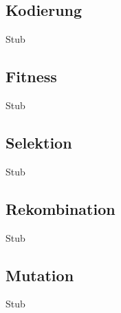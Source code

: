 \subsection{Kodierung}
Stub

\subsection{Fitness}
Stub

\subsection{Selektion}
Stub

\subsection{Rekombination}
Stub

\subsection{Mutation}
Stub
